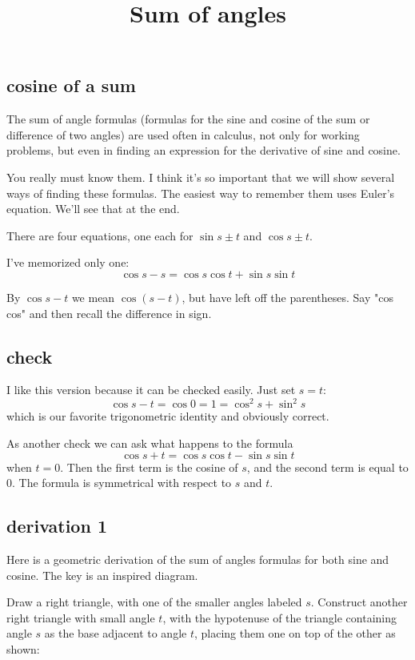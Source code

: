 \documentclass[11pt, oneside]{article}
\title{Sum of angles}
\date{}
\begin{document}
\maketitle
\large

\subsection*{cosine of a sum}

The sum of angle formulas (formulas for the sine and cosine of the sum or difference of two angles) are used often in calculus, not only for working problems, but even in finding an expression for the derivative of sine and cosine.

You really must know them.  I think it's so important that we will show several ways of finding these formulas.  The easiest way to remember them uses Euler's equation.  We'll see that at the end.

There are four equations, one each for $\sin s \pm t$ and $\cos s \pm t$.

I've memorized only one:
\[ \cos s - s = \cos s \cos t + \sin s \sin t \]

By $\cos s - t$ we mean $\cos (s - t)$, but have left off the parentheses.  Say "cos cos" and then recall the difference in sign.

\subsection*{check}

I like this version because it can be checked easily.  Just set $s = t$:
\[ \cos s - t = \cos 0 = 1 = \cos^2 s + \sin^2 s \]
which is our favorite trigonometric identity and obviously correct.

As another check we can ask what happens to the formula 
\[ \cos s + t = \cos s \cos t - \sin s \sin t \]
when $t = 0$.  Then the first term is the cosine of $s$, and the second term is equal to $0$.  The formula is symmetrical with respect to $s$ and $t$.

\subsection*{derivation 1}

Here is a geometric derivation of the sum of angles formulas for both sine and cosine.  The key is an inspired diagram.

Draw a right triangle, with one of the smaller angles labeled $s$.  Construct another right triangle with small angle $t$, with the hypotenuse of the triangle containing angle $s$ as the base adjacent to angle $t$, placing them one on top of the other as shown:
\end{document}
